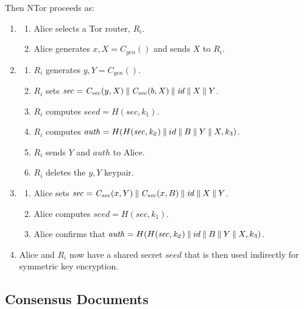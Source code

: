 Then NTor proceeds as:

\begin{enumerate} %
	\item \label{item:First2}
		\begin{enumerate}
			\item Alice selects a Tor router, $ R_{i} $.
			\item Alice generates $ x,X = \mathit{C}_{\mathit{gen}}() $ and sends $ X $ to $ R_{i} $.
		\end{enumerate}
	\item
		\begin{enumerate}
			\item $ R_{i} $ generates $ y,Y = \mathit{C}_{\mathit{gen}}() $.
			\item $ R_{i} $ sets $ \mathit{sec} = \mathit{C}_{\mathit{sec}}(y, X) \mathbin{\|} \mathit{C}_{\mathit{sec}}(b, X) \mathbin{\|} \mathit{id} \mathbin{\|} X \mathbin{\|} Y $.
			\item $ R_{i} $ computes $ \mathit{seed} = H(\mathit{sec, k_{1}}) $.
			\item $ R_{i} $ computes $ \mathit{auth} = H(H(\mathit{sec, k_{2}}) \mathbin{\|} id \mathbin{\|} B \mathbin{\|} Y \mathbin{\|} X, k_{3}) $.
			\item $ R_{i} $ sends $ Y $ and $ \mathit{auth} $ to Alice.
			\item $ R_{i} $ deletes the $ y,Y $ keypair.
		\end{enumerate}
	\item
		\begin{enumerate}
			\item Alice sets $ \mathit{sec} = \mathit{C}_{\mathit{sec}}(x, Y) \mathbin{\|} \mathit{C}_{\mathit{sec}}(x, B) \mathbin{\|} \mathit{id} \mathbin{\|} X \mathbin{\|} Y $.
			\item Alice computes $ \mathit{seed} = H(\mathit{sec, k_{1}}) $.
			\item Alice confirms that $ \mathit{auth} = H(H(\mathit{sec, k_{2}}) \mathbin{\|} id \mathbin{\|} B \mathbin{\|} Y \mathbin{\|} X, k_{3}) $.
		\end{enumerate}
	\item
		Alice and $ R_{i} $ now have a shared secret $ \mathit{seed} $ that is then used indirectly for symmetric key encryption.	
\end{enumerate}

\subsection{Consensus Documents}
\label{sec:ConsensusDocs}

